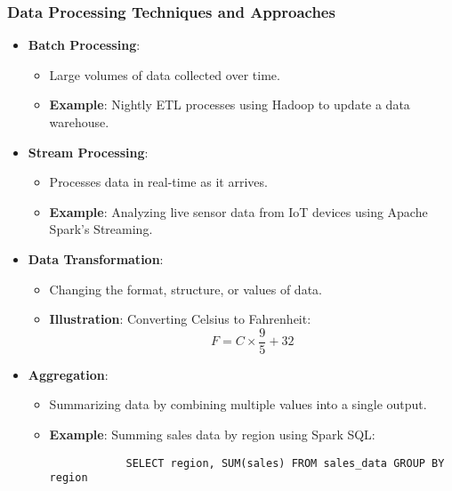 \documentclass[aspectratio=169]{beamer}
\begin{document}
\begin{frame}[fragile]
    \frametitle{Data Processing Techniques and Approaches}
    \begin{itemize}
        \item \textbf{Batch Processing}: 
        \begin{itemize}
            \item Large volumes of data collected over time.
            \item \textbf{Example}: Nightly ETL processes using Hadoop to update a data warehouse.
        \end{itemize}

        \item \textbf{Stream Processing}:
        \begin{itemize}
            \item Processes data in real-time as it arrives.
            \item \textbf{Example}: Analyzing live sensor data from IoT devices using Apache Spark’s Streaming.
        \end{itemize}

        \item \textbf{Data Transformation}:
        \begin{itemize}
            \item Changing the format, structure, or values of data.
            \item \textbf{Illustration}: Converting Celsius to Fahrenheit:
            \begin{equation}
            F = C \times \frac{9}{5} + 32
            \end{equation}
        \end{itemize}

        \item \textbf{Aggregation}:
        \begin{itemize}
            \item Summarizing data by combining multiple values into a single output.
            \item \textbf{Example}: Summing sales data by region using Spark SQL:
            \begin{lstlisting}
            SELECT region, SUM(sales) FROM sales_data GROUP BY region
            \end{lstlisting}
        \end{itemize}
    \end{itemize}
\end{frame}
\end{document}
